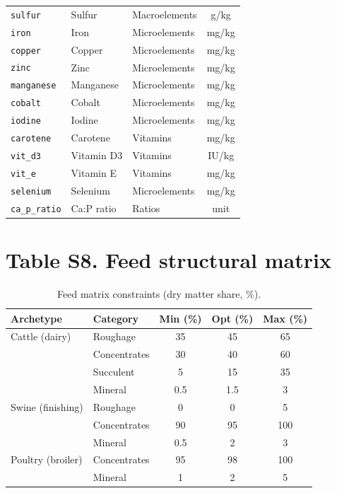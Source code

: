 \documentclass[11pt]{article}
\begin{document}
\begin{longtable}{lllc}
\texttt{sulfur} & Sulfur & Macroelements & g/kg \\
\texttt{iron} & Iron & Microelements & mg/kg \\
\texttt{copper} & Copper & Microelements & mg/kg \\
\texttt{zinc} & Zinc & Microelements & mg/kg \\
\texttt{manganese} & Manganese & Microelements & mg/kg \\
\texttt{cobalt} & Cobalt & Microelements & mg/kg \\
\texttt{iodine} & Iodine & Microelements & mg/kg \\
\texttt{carotene} & Carotene & Vitamins & mg/kg \\
\texttt{vit\_d3} & Vitamin D3 & Vitamins & IU/kg \\
\texttt{vit\_e} & Vitamin E & Vitamins & mg/kg \\
\texttt{selenium} & Selenium & Microelements & mg/kg \\
\texttt{ca\_p\_ratio} & Ca:P ratio & Ratios & unit \\
\end{longtable}

\section*{Table S8. Feed structural matrix}
\begin{table}[H]
\centering
\caption{Feed matrix constraints (dry matter share, \%).}\label{tab:s8_matrix}
\begin{tabular}{llccc}
\toprule
\textbf{Archetype} & \textbf{Category} & \textbf{Min (\%)} & \textbf{Opt (\%)} & \textbf{Max (\%)} \\
\midrule
Cattle (dairy) & Roughage & 35 & 45 & 65 \\
& Concentrates & 30 & 40 & 60 \\
& Succulent & 5 & 15 & 35 \\
& Mineral & 0.5 & 1.5 & 3 \\
Swine (finishing) & Roughage & 0 & 0 & 5 \\
& Concentrates & 90 & 95 & 100 \\
& Mineral & 0.5 & 2 & 3 \\
Poultry (broiler) & Concentrates & 95 & 98 & 100 \\
& Mineral & 1 & 2 & 5 \\
\bottomrule
\end{tabular}
\end{table}
\end{document}
